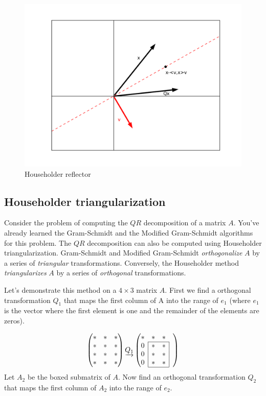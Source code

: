 \begin{figure}
	\centering
	\includegraphics[width= \textwidth]{fig1}
	\caption{Householder reflector}
	\label{fig:Householder reflector}
\end{figure}

\subsection*{Householder triangularization}
Consider the problem of computing the $QR$ decomposition of a matrix $A$. You've already learned the Gram-Schmidt and the Modified Gram-Schmidt algorithms for this problem. The $QR$ decomposition can also be computed using Householder triangularization. Gram-Schmidt and Modified Gram-Schmidt \emph{orthogonalize} $A$ by a series of \emph{triangular} transformations. Conversely, the Householder method \emph{triangularizes} $A$ by a series of \emph{orthogonal} transformations.

Let's demonstrate this method on a $4 \times 3$ matrix $A$. First we find a orthogonal transformation $Q_1$ that maps the first column of A into the range of $e_1$ (where $e_1$ is the vector where the first element is one and the remainder of the elements are zeros).

\def\mc#1{\multicolumn{1}{c|}{#1}}
\begin{equation*}
\begin{pmatrix}
\ast & \ast & \ast \\
\ast & \ast & \ast \\
\ast & \ast & \ast \\
\ast & \ast & \ast 
\end{pmatrix}
\underrightarrow{Q_1}
\begin{pmatrix}

\ast & \ast & \ast & \\ \cline{2-3}
\mc{0} & \ast & \mc{\ast}& \\
\mc{0} & \ast & \mc{\ast} & \\
\mc{0}& \ast & \mc{\ast} & \\ \cline{2-3}
\end{pmatrix}
\end{equation*}
Let $A_2$ be the boxed submatrix of $A$. Now find an orthogonal transformation $Q_2$ that maps the first column of $A_2$ into the range of $e_2$. 

